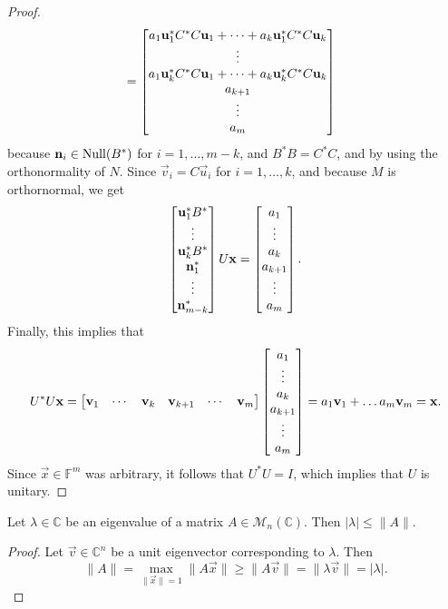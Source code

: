 \documentclass{homework}
\begin{document}
\begin{proof}
\begin{equation*}
\begin{aligned}
			&= \left[\begin{matrix}a_1\mathbf{u}_1^*C^*C\mathbf{u}_1 + \dots  + a_k\mathbf{u}_1^*C^*C\mathbf{u}_k \\ \vdots \\ a_1\mathbf{u}_k^*C^*C\mathbf{u}_1 + \dots  + a_k\mathbf{u}_k^*C^*C\mathbf{u}_k \\ a_{k+1} \\ \vdots \\ a_m\end{matrix}\right]
			\end{aligned}
		\end{equation*}
		because $\mathbf{n}_i \in \mathrm{Null}(B^*)$ for $i = 1, \dots, m-k$, and $B^*B = C^*C$, and by using the orthonormality of $N$. Since $\vec{v}_i = C\vec{u}_i$ for $i =1,\dots, k$, and because $M$ is orthornormal, we get
		\begin{equation*}
			\left[\begin{matrix}\mathbf{u}_1^*B^* \\ \vdots \\ \mathbf{u}_k^*B^* \\ \mathbf{n}_1^* \\ \vdots \\ \mathbf{n}_{m-k}^*\end{matrix}\right] U\mathbf{x} = \left[\begin{matrix}a_1\\\vdots\\ a_k \\ a_{k+1} \\ \vdots \\ a_m\end{matrix}\right].
		\end{equation*}
		Finally, this implies that
		\begin{equation*}
			U^*U\mathbf{x} = \left[\begin{matrix}\mathbf{v}_1 & \cdots & \mathbf{v}_k & \mathbf{v}_{k+1} & \cdots & \mathbf{v}_m\end{matrix}\right] \left[\begin{matrix}a_1\\\vdots\\ a_k \\ a_{k+1} \\ \vdots \\ a_m\end{matrix}\right] = a_1\mathbf{v}_1 + \dots a_m\mathbf{v}_m = \mathbf{x}.
		\end{equation*}
		Since $\vec{x} \in \mathbb{F}^m$ was arbitrary, it follows that $U^*U = I$, which implies that $U$ is unitary.
	\end{proof}
	
	\question Let $\lambda \in \mathbb{C}$ be an eigenvalue of a matrix $A\in \mathcal{M}_n(\mathbb{C})$. Then $|\lambda|\le \lVert A\rVert$.
	\begin{proof}
		Let $\vec{v} \in \mathbb{C}^n$ be a unit eigenvector corresponding to $\lambda$. Then
		\begin{equation*}
			\lVert A\rVert = \max_{\lVert\vec{x}\rVert = 1} \lVert A\vec{x}\rVert \ge \lVert A\vec{v}\rVert = \lVert \lambda \vec{v}\rVert = |\lambda|.
		\end{equation*}
	\end{proof}
	
\end{document}
